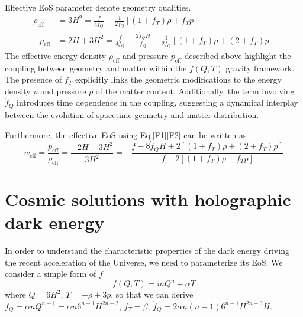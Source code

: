 \documentclass[preprint]{aastex631}
\begin{document}
Effective EoS parameter denote geometry qualities.
\begin{align}
\rho_{\text{eff}}&=3H^2=\frac{f}{4f_Q}-\frac{1}{2f_Q}[(1+f_T)\rho+f_T p] \label{F1}\\
-p_{\text{eff}}&=2\dot{H}+3H^2=\frac{f}{4f_Q}-\frac{2\dot{f}_Q H}{f_Q}+\frac{1}{2f_Q}[(1+f_T)\rho +(2+f_T)p] \label{F2}
\end{align}
The effective energy density \(\rho_{\text{eff}}\) and pressure \(p_{\text{eff}}\) described above highlight the coupling between geometry and matter within the \(f(Q, T)\) gravity framework. The presence of \(f_T\) explicitly links the geometric modifications to the energy density \(\rho\) and pressure \(p\) of the matter content. Additionally, the term involving \(\dot{f}_Q\) introduces time dependence in the coupling, suggesting a dynamical interplay between the evolution of spacetime geometry and matter distribution. 

Furthermore, the effective EoS using Eq.\eqref{F1}\eqref{F2} can be written as
\begin{equation}
w_{\text{eff}}=\frac{p_{\text{eff}}}{\rho_{\text{eff}}} = \frac{-2\dot{H}-3H^2}{3H^2}= -\frac{f - 8\dot{f}_Q H + 2[(1 + f_T)\rho + (2 + f_T)p]}{f - 2[(1 + f_T)\rho + f_T p]}
\end{equation}



\section{Cosmic solutions with holographic dark energy}
In order to understand the characteristic properties of the dark energy driving the recent acceleration of the Universe, we need to parameterize its EoS.
We consider a simple form of $f$ 
\begin{equation}
    f(Q,T)=m Q^n+\alpha T
\end{equation}
where $Q=6H^2$, $T=-\rho+3p$, so that we can derive $f_Q=\alpha n Q^{n-1}=\alpha n 6^{n-1}H^{2n-2}$, $f_T=\beta$, $\dot{f}_Q=2\alpha n(n-1)6^{n-1}H^{2n-3}\dot{H}$.
\end{document}
